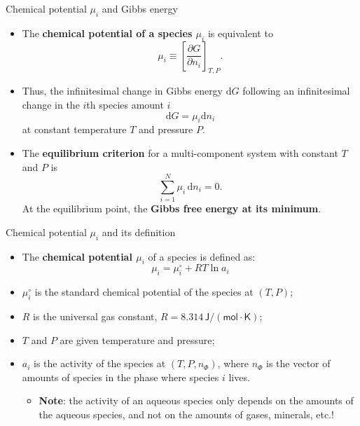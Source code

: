 %
%
\begin{frame}[<+->]{Chemical potential $\mu_{i}$ and Gibbs energy}
\begin{itemize}
\item The \alert{\bf chemical potential of a species $\mu_{i}$} is equivalent to
\[
\mu_{i}\equiv\left[\frac{\partial G}{\partial n_{i}}\right]_{T,P}.
\]
%
\item Thus, the infinitesimal change in Gibbs energy $\mathrm{d}G$ following an infinitesimal change in the $i$th species amount $i$ 
%
\[
\mathrm{d}G=\mu_{i}\mathrm{d}n_{i}
\]
at constant temperature $T$ and pressure $P$.
\item The \textbf{equilibrium criterion} for a multi-component system with constant $T$ and $P$ is
\[
\sum_{i=1}^N \mu_i \, \mathrm{d}n_{i} = 0.
\]
At the equilibrium point, the \textbf{Gibbs free energy at its minimum}.
%
\end{itemize}
\end{frame}
%
%
\begin{frame}{Chemical potential $\mu_{i}$ and its definition}
\begin{itemize}
\item The \alert{\textbf{chemical potential $\mu_{i}$}} of a species is defined as:
\[
\mu_{i}=\mu_{i}^{\circ}+RT\ln a_{i}
\]
%
\item $\mu_{i}^{\circ}$ is the \alert{standard chemical potential} of
the species at $(T,P)$;
\item $R$ is the \alert{universal gas constant}, $R= 8.314 \, \mathsf{J/(mol \cdot K)}$;
\item $T$ and $P$ are given temperature and pressure;
\item $a_{i}$ is the \alert{activity} of the species at $(T,P,n_{\Phi})$,
where $n_{\Phi}$ is the vector of amounts of species in the phase
where species $i$ lives.
\begin{itemize}
\item \textbf{Note}: the activity of an aqueous species only depends on the
amounts of the aqueous species, and not on the amounts of gases, minerals,
etc.!
\end{itemize}

\end{itemize}
\end{frame}
